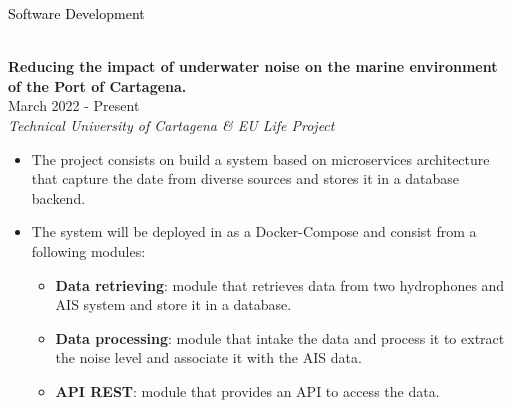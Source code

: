 \documentclass[10pt]{article}
\begin{document}
{\LARGE \textcolor{black}{Software Development}}
\vspace{-1.5pt}
\par\noindent\hrulefill %
\\[0.35cm]
\textbf{Reducing the impact of underwater noise on the marine environment of the Port of Cartagena.} \hfill  
\\[0.15cm] 
 \hfill { \small March 2022 - Present}
\\[0.15cm]
\emph{Technical University of Cartagena \& EU Life Project} \hfill    
	\begin{itemize}[itemsep = -0.75 mm, leftmargin=*]
	\item[{\color[RGB]{10,0,254}$\bullet$}] \noindent The project consists on build a system based on microservices architecture that capture
	the date from diverse sources and stores it in a database backend.
	\item[{\color[RGB]{10,0,254}$\bullet$}] \noindent The system will be deployed in as a Docker-Compose and consist from a following modules:
	\begin{itemize}
		\item \textbf{Data retrieving}: module that retrieves data from two hydrophones and AIS system and store it in a database.
		\item \textbf{Data processing}: module that intake the data and process it to extract the noise level and associate it with the AIS data.
		\item \textbf{API REST}: module that provides an API to access the data.
	\end{itemize}
	\end{itemize} 	
\end{document}
